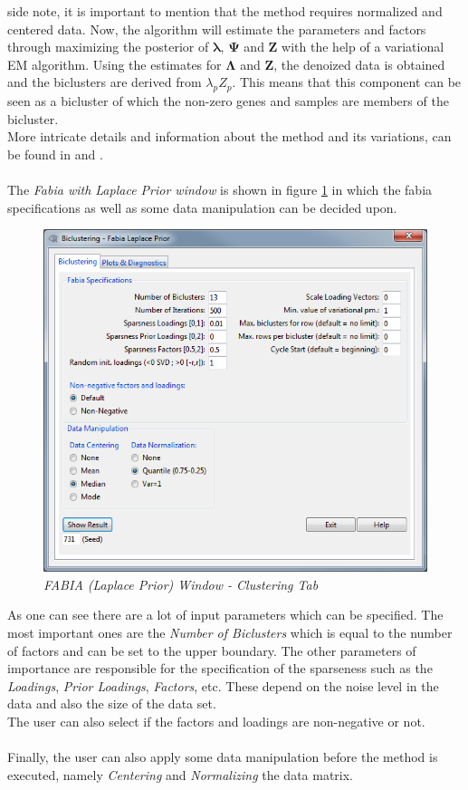 \documentclass[a4paper]{article}\usepackage[]{graphicx}\usepackage[]{color}
\begin{document}
side note, it is important to mention that the method requires normalized and
centered data.
Now, the algorithm will estimate the parameters and factors through maximizing
the posterior of $\boldsymbol\lambda$, $\boldsymbol\Psi$ and $\mathbf{Z}$ with
the help of a variational EM algorithm.
Using the estimates for $\boldsymbol\Lambda$ and $\mathbf{Z}$, the denoized data is
obtained and the biclusters are derived from $\lambda_p Z_p$. This means that
this component can be seen as a bicluster of which the non-zero genes and
samples are members of the bicluster. \\
More intricate details and information about the method and its variations, can
be found in \citet{Hochreiter2010} and \citet{Hochreiter2014a}.
\\ \\
The {\it Fabia with Laplace Prior window} is shown in figure
\ref{fabialaplace_clusttab} in which the fabia specifications as well as some
data manipulation can be decided upon.
\begin{figure}[H]
\centering
\includegraphics[scale=0.5]{figures/fabialaplace_clusttab.png}
\caption{{\it FABIA (Laplace Prior) Window - Clustering
Tab}\label{fabialaplace_clusttab}}
\end{figure}
\noindent As one can see there are a lot of input parameters which can be
specified. The most important ones are the {\it Number of Biclusters} which is
equal to the number of factors and can be set to the upper boundary. The other
parameters of importance are responsible for the specification of the sparseness
such as the {\it Loadings}, {\it Prior Loadings}, {\it Factors}, etc. These
depend on the noise level in the data and also the size of the data set.\\
The user can also select if the factors and loadings are non-negative
or not. 
\\ \\
Finally, the user can also apply some data manipulation before the method is
executed, namely {\it Centering} and {\it Normalizing} the data matrix.
\end{document}
